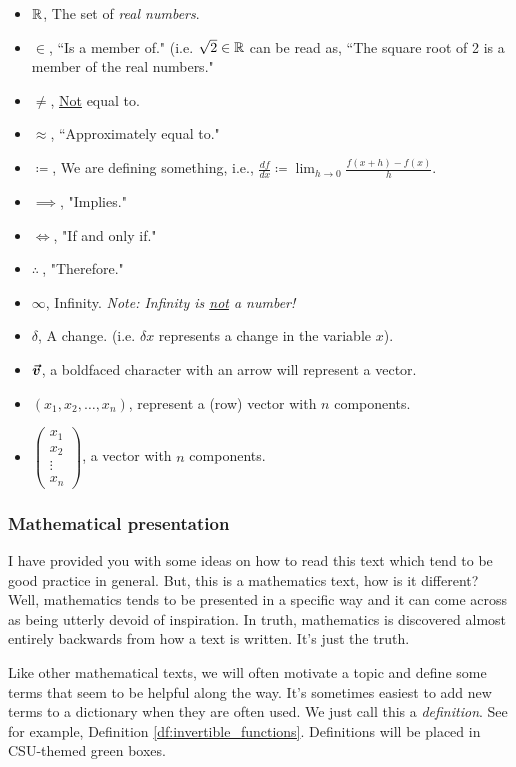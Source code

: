    \begin{itemize}
        \item $\mathbb{R}$, The set of \emph{real numbers}.
        \item $\in$, ``Is a member of." (i.e. $\sqrt{2}\in \mathbb{R}$ can be read as, ``The square root of 2 is a member of the real numbers."
        \item $\neq$, \underline{Not} equal to.
        \item $\approx$, ``Approximately equal to."
        \item $\coloneqq$, We are defining something, i.e., $\frac{df}{dx}\coloneqq \lim_{h\to 0}\frac{f(x+h)-f(x)}{h}$.
        \item $\implies$, "Implies."
        \item $\iff$, "If and only if."
        \item $\therefore~$, "Therefore."
        \item $\infty$, Infinity.  \emph{Note: Infinity is \underline{not} a number!}
        \item $\delta$, A change. (i.e. $\delta x$ represents a change in the variable $x$).
        \item $\boldsymbol{\boldsymbol{\vec{v}}}$, a boldfaced character with an arrow will represent a vector.
        \item $(x_1,x_2,\dots,x_n)$, represent a (row) vector with $n$ components.
        \item $\begin{pmatrix} x_1\\ x_2\\ \vdots \\ x_n\end{pmatrix}$, a vector with $n$ components.
    \end{itemize}
    
    \subsubsection{Mathematical presentation}
    
    I have provided you with some ideas on how to read this text which tend to be good practice in general.  But, this is a mathematics text, how is it different? Well, mathematics tends to be presented in a specific way and it can come across as being utterly devoid of inspiration.  In truth, mathematics is discovered almost entirely backwards from how a text is written.  It's just the truth.
    
    Like other mathematical texts, we will often motivate a topic and define some terms that seem to be helpful along the way.  It's sometimes easiest to add new terms to a dictionary when they are often used.  We just call this a \emph{definition}. See for example, Definition \ref{df:invertible_functions}. Definitions will be placed in CSU-themed green boxes.
    
